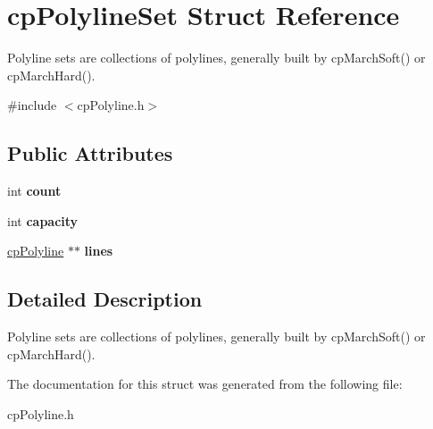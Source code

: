 \hypertarget{structcp_polyline_set}{}\section{cp\+Polyline\+Set Struct Reference}
\label{structcp_polyline_set}


Polyline sets are collections of polylines, generally built by cp\+March\+Soft() or cp\+March\+Hard().  




{\ttfamily \#include $<$cp\+Polyline.\+h$>$}

\subsection*{Public Attributes}
\begin{DoxyCompactItemize}
\item 
\hypertarget{structcp_polyline_set_aaa93d37daed5b7f89f35319521fd1a7f}{}int {\bfseries count}\label{structcp_polyline_set_aaa93d37daed5b7f89f35319521fd1a7f}

\item 
\hypertarget{structcp_polyline_set_a0e2a913e1b6a8ead8529157fb7674cac}{}int {\bfseries capacity}\label{structcp_polyline_set_a0e2a913e1b6a8ead8529157fb7674cac}

\item 
\hypertarget{structcp_polyline_set_aed1643a4bd1cc86c1a5063999caceec7}{}\hyperlink{structcp_polyline}{cp\+Polyline} $\ast$$\ast$ {\bfseries lines}\label{structcp_polyline_set_aed1643a4bd1cc86c1a5063999caceec7}

\end{DoxyCompactItemize}


\subsection{Detailed Description}
Polyline sets are collections of polylines, generally built by cp\+March\+Soft() or cp\+March\+Hard(). 

The documentation for this struct was generated from the following file\+:\begin{DoxyCompactItemize}
\item 
cp\+Polyline.\+h\end{DoxyCompactItemize}
